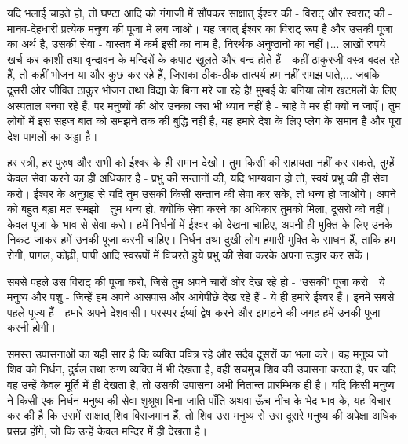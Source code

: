 यदि भलाई चाहते हो, तो घण्टा आदि को गंगाजी में सौंपकर साक्षात् ईश्वर की - विराट् और स्वराट् की - मानव-देहधारी प्रत्येक मनुष्य की पूजा में लग जाओ। यह जगत् ईश्वर का विराट् रूप है और उसकी पूजा का अर्थ है, उसकी सेवा - वास्तव में कर्म इसी का नाम है, निरर्थक अनुष्ठानों का नहीं।... लाखों रुपये खर्च कर काशी तथा वृन्दावन के मन्दिरों के कपाट खुलते और बन्द होते हैं। कहीं ठाकुरजी वस्त्र बदल रहे हैं, तो कहीं भोजन या और कुछ कर रहे हैं, जिसका ठीक-ठीक तात्पर्य हम नहीं समझ पाते,... जबकि दूसरी ओर जीवित ठाकुर भोजन तथा विद्या के बिना मरे जा रहे है! मुम्बई के बनिया लोग खटमलों के लिए अस्पताल बनवा रहे हैं, पर मनुष्यों की ओर उनका जरा भी ध्यान नहीं है - चाहे वे मर ही क्यों न जाएँ। तुम लोगों में इस सहज बात को समझने तक की बुद्धि नहीं है, यह हमारे देश के लिए प्लेग के समान है और पूरा देश पागलों का अड्डा है। 

हर स्त्री, हर पुरुष और सभी को ईश्वर के ही समान देखो। तुम किसी की सहायता नहीं कर सकते, तुम्हें केवल सेवा करने का ही अधिकार है - प्रभु की सन्तानों की, यदि भाग्यवान हो तो, स्वयं प्रभु की ही सेवा करो। ईश्वर के अनुग्रह से यदि तुम उसकी किसी सन्तान की सेवा कर सके, तो धन्य हो जाओगे। अपने को बहुत बड़ा मत समझो। तुम धन्य हो, क्योंकि सेवा करने का अधिकार तुमको मिला, दूसरो को नहीं। केवल पूजा के भाव से सेवा करो। हमें निर्धनों में ईश्वर को देखना चाहिए, अपनी ही मुक्ति के लिए उनके निकट जाकर हमें उनकी पूजा करनी चाहिए। निर्धन तथा दुखी लोग हमारी मुक्ति के साधन हैं, ताकि हम रोगी, पागल, कोढ़ी, पापी आदि स्वरूपों में विचरते हुये प्रभु की सेवा करके अपना उद्धार कर सकें। 

सबसे पहले उस विराट् की पूजा करो, जिसे तुम अपने चारों ओर देख रहे हो - ‘उसकी’ पूजा करो। ये मनुष्य और पशु - जिन्हें हम अपने आसपास और आगेपीछे देख रहे हैं - ये ही हमारे ईश्वर हैं। इनमें सबसे पहले पूज्य हैं - हमारे अपने देशवासी। परस्पर ईर्ष्या-द्वेष करने और झगड़ने की जगह हमें उनकी पूजा करनी होगी। 

समस्त उपासनाओं का यही सार है कि व्यक्ति पवित्र रहे और सदैव दूसरों का भला करे। वह मनुष्य जो शिव को निर्धन, दुर्बल तथा रुग्ण व्यक्ति में भी देखता है, वही सचमुच शिव की उपासना करता है, पर यदि वह उन्हें केवल मूर्ति में ही देखता है, तो उसकी उपासना अभी नितान्त प्रारम्भिक ही है। यदि किसी मनुष्य ने किसी एक निर्धन मनुष्य की सेवा-शुश्रूषा बिना जाति-पाँति अथवा ऊँच-नीच के भेद-भाव के, यह विचार कर की है कि उसमें साक्षात् शिव विराजमान हैं, तो शिव उस मनुष्य से उस दूसरे मनुष्य की अपेक्षा अधिक प्रसन्न होंगे, जो कि उन्हें केवल मन्दिर में ही देखता है। 

